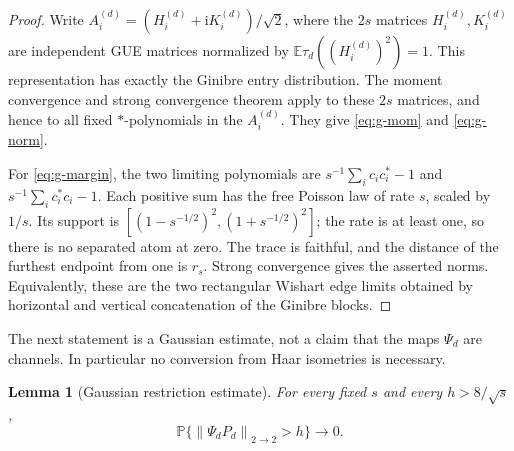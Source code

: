 \documentclass[11pt]{article}
\newtheorem{lemma}[theorem]{Lemma}
\theoremstyle{remark}
\newcommand{\E}{\mathbb E}
\newcommand{\Prob}{\mathbb P}
\newcommand{\hs}{2\to2}
\newcommand{\norm}[1]{\left\lVert#1\right\rVert}
\begin{document}
\begin{proof}
Write $A_i^{(d)}=(H_i^{(d)}+\mathrm iK_i^{(d)})/\sqrt2$,
where the $2s$ matrices $H_i^{(d)},K_i^{(d)}$ are independent
GUE matrices normalized by $\E\tau_d((H_i^{(d)})^2)=1$.
This representation has exactly the Ginibre entry distribution.
The moment convergence and strong convergence theorem
\cite[(1.2) and Theorem~A]{HT} apply to these $2s$ matrices,
and hence to all fixed $*$-polynomials in the $A_i^{(d)}$.
They give \eqref{eq:g-mom} and \eqref{eq:g-norm}.

For \eqref{eq:g-margin}, the two limiting polynomials are
$s^{-1}\sum_i c_ic_i^*-1$ and $s^{-1}\sum_i c_i^*c_i-1$.
Each positive sum has the free Poisson law of rate $s$, scaled
by $1/s$. Its support is
$[(1-s^{-1/2})^2,(1+s^{-1/2})^2]$; the rate is at least one,
so there is no separated atom at zero. The trace is faithful,
and the distance of the furthest endpoint from one is $r_s$.
Strong convergence gives the asserted norms. Equivalently,
these are the two rectangular Wishart edge limits obtained by
horizontal and vertical concatenation of the Ginibre blocks.
\end{proof}

The next statement is a Gaussian estimate, not a claim that the
maps $\Psi_d$ are channels. In particular no conversion from
Haar isometries is necessary.

\begin{lemma}[Gaussian restriction estimate]\label{lem:restriction}
For every fixed $s$ and every $h>8/\sqrt{s}$,
\begin{equation}
 \Prob\{\norm{\Psi_dP_d}_{\hs}>h\}\longrightarrow0.
       \label{eq:restriction}
\end{equation}
\end{lemma}
\end{document}
